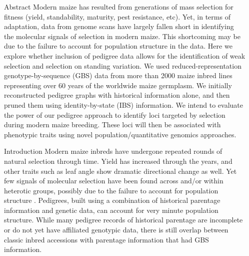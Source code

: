 \documentclass[final]{beamer}
\newlength{\sepwid}
\newlength{\onecolwid}
\begin{document}
\begin{frame}[t] %

\begin{columns}[t] %

\begin{column}{\sepwid}\end{column} %

\begin{column}{\onecolwid} %


\begin{alertblock}{Abstract}
Modern maize has resulted from generations of mass selection for fitness (yield, standability, maturity, pest resistance, etc). Yet, in terms of adaptation, data from genome scans have largely fallen short in identifying the molecular signals of selection in modern maize. This shortcoming may be due to the failure to account for population structure in the data. Here we explore whether inclusion of pedigree data allows for the identification of weak selection and selection on standing variation. We used reduced-representation genotype-by-sequence (GBS) data from more than 2000 maize inbred lines representing over 60 years of the worldwide maize germplasm. We initially reconstructed pedigree graphs with historical information alone, and then pruned them using identity-by-state (IBS) information. We intend to evaluate the power of our pedigree approach to identify loci targeted by selection during modern maize breeding. These loci will then be associated with phenotypic traits using novel population/quantitative genomics approaches.
\end{alertblock}


\begin{block}{Introduction}
Modern maize inbreds have undergone repeated rounds of natural selection through time. Yield has increased through the years, and other traits such as leaf angle show dramatic directional change as well. Yet few signals of molecular selection have been found across and/or within heterotic groups, possibly due to the failure to account for population structure \cite{Gerke:2013tw}. Pedigrees, built using a combination of historical parentage information and genetic data, can account for very minute population structure. While many pedigree records of historical parentage are incomplete or do not yet have affiliated genotypic data, there is still overlap between classic inbred accessions with parentage information that had GBS information. 


\end{block}
\end{column}
\end{columns}
\end{frame}
\end{document}
